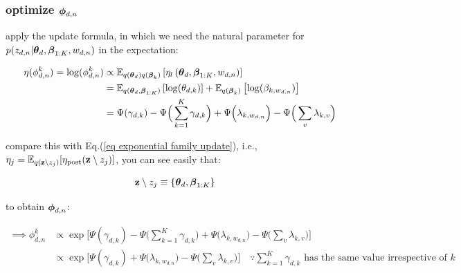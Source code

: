 \documentclass{article}
\def\post{\text{post}}
\begin{document}
\subsubsection{optimize $\boldsymbol{\phi}_{d,n}$}


apply the update formula, in which we need the natural parameter for $p(z_{d,n} | \boldsymbol{\theta}_d, \boldsymbol{\beta}_{1:K}, w_{d,n} )$ in the expectation:

\begin{equation}\begin{split}
\eta( \phi^k_{d,n} ) = \log( \phi^k_{d,n} ) &\propto \mathbb{E}_{q(\boldsymbol{\theta}_d)q(\boldsymbol{\beta}_k) } \left[ \eta_l \left(\boldsymbol{\theta}_d, \boldsymbol{\beta}_{1:K}, w_{d,n} \right) \right]\\
&= \mathbb{E}_{q(\boldsymbol{\theta}_d, \boldsymbol{\beta}_{1:K})} \left[ \log(\theta_{d,k}) \right] +  \mathbb{E}_{q(\boldsymbol{\beta}_k)}  \left[  \log(\beta_{k,w_{d,n}}) \right]\\ 
&= \Psi(\gamma_{d,k}) - \Psi \Big( \sum_{k=1}^K \gamma_{d,k}  \Big) +  \Psi \Big( \lambda_{k, w_{d,n}} \Big) - \Psi \Big( \sum_{v} \lambda_{k,v}  \Big) \\
\end{split}\end{equation}

compare this with Eq.(\ref{eq exponential family update}), i.e., $\eta_j =  \E_{q(\z \setminus z_j )} [\eta_\post (\z \setminus z_j )]$, you can see easily that: 

\begin{equation}\begin{split}
{\mathbf z} \setminus z_j &\equiv \{ \boldsymbol{\theta}_d, \boldsymbol{\beta}_{1:K} \}
\end{split}\end{equation}





to obtain $\boldsymbol{\phi}_{d,n}$:

\begin{equation}\begin{split}
\implies \phi^k_{d,n} &\propto  
\exp \Bigg[ \Psi(\gamma_{d,k}) - \Psi \Big( \sum_{k=1}^K \gamma_{d,k}  \Big)+  \Psi \Big( \lambda_{k, w_{d,n}} \Big) - \Psi \Big( \sum_{v} \lambda_{k,v}  \Big) \Bigg] \\
&\propto \exp \bigg[ \Psi(\gamma_{d,k}) +  \Psi \Big( \lambda_{k, w_{d,n}} \Big) - \Psi \Big( \sum_{v} \lambda_{k,v}  \Big) \bigg] \quad
\because \sum_{k=1}^K \gamma_{d,k}  \text{ has the same value irrespective of } k\\
\end{split}\end{equation}
\end{document}

